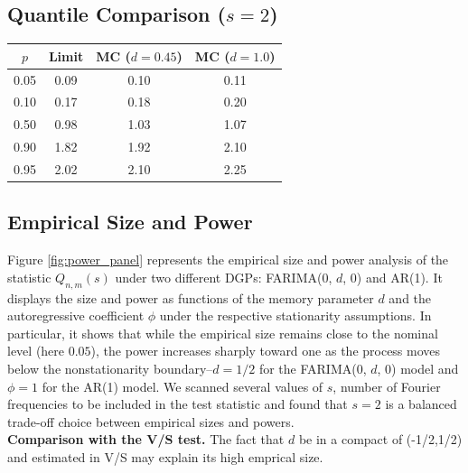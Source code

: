 \documentclass[12pt]{article}
\begin{document}
\subsection{Quantile Comparison ($s=2$)}
\begin{center}
\begin{tabular}{c|ccc}
\hline
$p$ & Limit & MC ($d=0.45$) & MC ($d=1.0$)\\
\hline
0.05 & 0.09 & 0.10 & 0.11\\
0.10 & 0.17 & 0.18 & 0.20\\
0.50 & 0.98 & 1.03 & 1.07\\
0.90 & 1.82 & 1.92 & 2.10\\
0.95 & 2.02 & 2.10 & 2.25\\
\hline
\end{tabular}
\end{center}
\fi 
\subsection{Empirical Size and Power} 
Figure \ref{fig:power_panel} represents the empirical size and power analysis of the statistic $Q_{n,m}(s)$ under two different DGPs: FARIMA(0, $d$, 0) and AR(1). It displays the size and power as functions of the memory parameter $d$ and the autoregressive coefficient $\phi$ under the respective stationarity assumptions. In particular, it shows that while the empirical size remains close to the nominal level (here $0.05$), the power increases sharply toward one as the process moves below the nonstationarity boundary--$d = 1/2$ for the FARIMA(0, $d$, 0) model and $\phi = 1$ for the AR(1) model.  We scanned several values of $s$, number of Fourier frequencies to be included in the test statistic and found that $s=2$ is a balanced trade-off choice between empirical sizes and powers.\\
\textbf{Comparison with the V/S test.} The fact that $d$ be in a compact of (-1/2,1/2) and estimated in V/S may explain its high emprical size.
\end{document}
